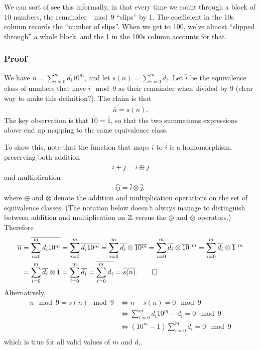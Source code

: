 \documentclass[12pt]{article}
\begin{document}
\begin{mdframed}
  We can sort of see this informally, in that every time we count through a
  block of 10 numbers, the remainder $\mod 9$ ``slips'' by 1. The coefficient
  in the 10s column records the ``number of slips''. When we get to 100, we've
  almost ``slipped through'' a whole block, and the 1 in the 100s column
  accounts for that.
  \subsubsection*{Proof}
  We have $n = \sum_{i=0}^m d_i 10^m$, and let $s(n) = \sum_{i=0}^m d_i$. Let
  $\bar{i}$ be the equivalence class of numbers that have $i \mod 9$ as their
  remainder when divided by 9 (clear way to make this definition?). The claim
  is that
  \begin{align*}
  \bar n = \bar{s(n)}.
  \end{align*}
  The key observation is that $\bar {10} = \bar 1$, so that the two summations
  expressions above end up mapping to the same equivalence class.

  To show this, note that the function that maps $i$ to $\bar i$ is a
  homomorphism, preserving both addition
  \begin{align*}
  \bar{i + j} = \bar i \oplus \bar j
  \end{align*}
  and multiplication
  \begin{align*}
  \bar{ij} = \bar i \otimes \bar j,
  \end{align*}
  where $\oplus$ and $\otimes$ denote the addition and multiplication
  operations on the set of equivalence classes. (The notation below doesn't
  always manage to distinguish between addition and multiplication on $\Z$
  versus the $\oplus$ and $\otimes$ operators.) Therefore
  \begin{align*}
    \bar n &= \bar{\sum_{i=0}^m d_i 10^m}
           = \sum_{i=0}^m \bar{d_i 10^m}
           = \sum_{i=0}^m \bar{d_i} \otimes \bar{10^m}
           = \sum_{i=0}^m \bar{d_i} \otimes \bar{10}~^m
           = \sum_{i=0}^m \bar{d_i} \otimes \bar{1}~^m\\
           &= \sum_{i=0}^m \bar{d_i} \otimes \bar{1}
           = \sum_{i=0}^m \bar{d_i}
           = \bar{\sum_{i=0}^m d_i} = \bar{s(n)}. \qed\\
  \end{align*}
  Alternatively,
  \begin{align*}
    n \mod 9 = s(n) \mod 9
    &\iff n - s(n) = 0 \mod 9\\
    &\iff \sum_{i=0}^m d_i 10^m - d_i = 0 \mod 9\\
    &\iff (10^m - 1)\sum_{i=0}^m d_i = 0 \mod 9\\
  \end{align*}
  which is true for all valid values of $m$ and $d_i$.
\end{mdframed}
\end{document}
